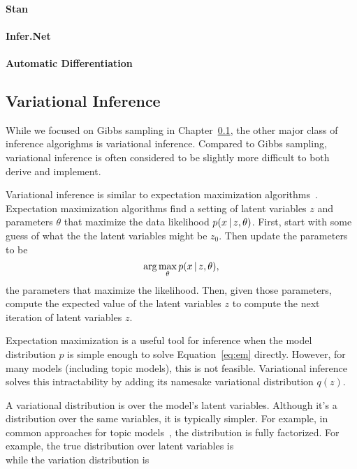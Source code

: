 
\paragraph{Stan}


\paragraph{Infer.Net}



\paragraph{Automatic Differentiation}



\subsection{Variational Inference}

While we focused on Gibbs sampling in Chapter~\ref{}, the other major
class of inference algorighms is variational inference.  Compared to
Gibbs sampling, variational inference is often considered to be
slightly more difficult to both derive and implement.

Variational inference is similar to expectation maximization
algorithms~\cite{}.  Expectation maximization algorithms find a
setting of latent variables $z$ and parameters $\theta$ that maximize
the data likelihood $p(x \, | \, z, \theta)$.  First, start with some guess
of what the the latent variables might be $z_0$.  Then update the
parameters to be
\begin{equation}
  \arg \max_{\theta} p(x \, | \, z, \theta),
\label{eq:em}
\end{equation}
the parameters that maximize the likelihood.  Then, given those
parameters, compute the expected value of the latent variables $z$ to
compute the next iteration of latent variables $z$.

Expectation maximization is a useful tool for inference when the model
distribution $p$ is simple enough to solve Equation~\ref{eq:em}
directly.  However, for many models (including topic models), this is
not feasible.  Variational inference solves this intractability by
adding its namesake variational distribution $q(z)$.

A variational distribution is over the model's latent variables.
Although it's a distribution over the same variables, it is typically
simpler.  For example, in common approaches for topic models~\citep{}, the
distribution is fully factorized.  For example, the true distribution
over latent variables is
\begin{equation}

\end{equation}
while the variation distribution is
\begin{equation}

\end{equation}


